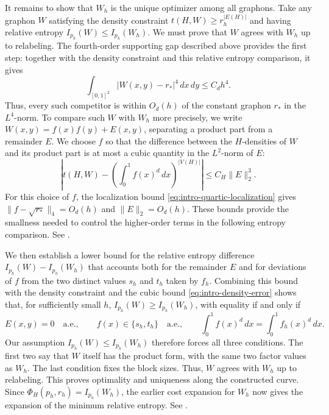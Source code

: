 \begin{enumerate}[label=(\roman*),leftmargin=2.2em]
It remains to show that $W_h$ is the unique optimizer among all graphons.
Take any graphon $W$ satisfying the density constraint
$t(H,W)\ge r_h^{|E(H)|}$ and having relative entropy
$I_{p_h}(W)\le I_{p_h}(W_h)$.  We must prove that $W$ agrees with $W_h$ up to
relabeling.  The fourth-order supporting gap described above provides
the first step: together with the density constraint and this relative entropy
comparison, it gives
\begin{equation}\label{eq:intro-quartic-localization}
  \int_{[0,1]^2}|W(x,y)-r_*|^4\,dx\,dy\le C_d h^4.
\end{equation}
Thus, every such competitor is within $O_d(h)$ of the constant graphon
$r_*$ in the $L^4$-norm.  To compare such $W$ with $W_h$ more precisely, we write
$W(x,y)=f(x)f(y)+E(x,y)$, separating a product part from a remainder $E$.
We choose $f$ so that the difference between the $H$-densities of $W$
and its product part is at most a cubic quantity in the $L^2$-norm of $E$:
\begin{equation}\label{eq:intro-density-error}
  \left|t(H,W)-\left(\int_0^1 f(x)^d\,dx\right)^{|V(H)|}\right|
  \le C_H\|E\|_2^3.
\end{equation}
For this choice of $f$, the localization bound
\eqref{eq:intro-quartic-localization} gives
$\|f-\sqrt{r_*}\|_4=O_d(h)$ and $\|E\|_2=O_d(h)$.
These bounds provide the smallness needed to control the higher-order
terms in the following entropy comparison.
See .

We then establish a lower bound for the relative entropy difference
$I_{p_h}(W)-I_{p_h}(W_h)$ that accounts both for the remainder $E$
and for deviations of $f$ from the two distinct values
$s_h$ and $t_h$ taken by $f_h$.  Combining this bound with the density
constraint and the cubic bound
\eqref{eq:intro-density-error} shows that, for sufficiently
small $h$, $I_{p_h}(W)\ge I_{p_h}(W_h)$, with equality if and only if
\[
  E(x,y)=0 \quad \text{a.e.},\qquad
  f(x)\in\{s_h,t_h\} \quad \text{a.e.},\qquad
  \int_0^1 f(x)^d\,dx=\int_0^1 f_h(x)^d\,dx.
\]
Our assumption $I_{p_h}(W)\le I_{p_h}(W_h)$ therefore forces all three
conditions.  The first two say that $W$ itself has the product form,
with the same two factor values as $W_h$.  The last condition fixes the block sizes.
Thus, $W$ agrees with $W_h$ up to relabeling.  This proves optimality
and uniqueness along the constructed curve.
Since $\Phi_H(p_h,r_h)=I_{p_h}(W_h)$, the earlier cost expansion for $W_h$
now gives the expansion of the minimum relative entropy.
See .
\end{enumerate}

